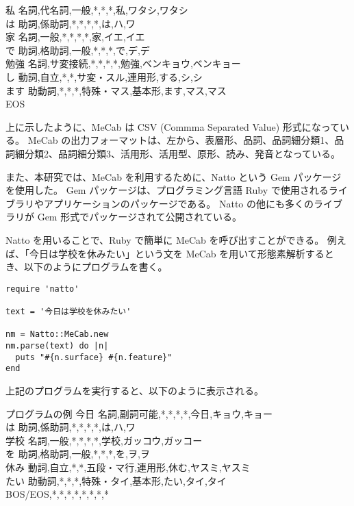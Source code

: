 \documentclass[11pt,a4j]{jsarticle}
\begin{document}
\begin{itembox}[l]
私  名詞,代名詞,一般,*,*,*,私,ワタシ,ワタシ\\
は  助詞,係助詞,*,*,*,*,は,ハ,ワ\\
家  名詞,一般,*,*,*,*,家,イエ,イエ\\
で  助詞,格助詞,一般,*,*,*,で,デ,デ\\
勉強  名詞,サ変接続,*,*,*,*,勉強,ベンキョウ,ベンキョー\\
し  動詞,自立,*,*,サ変・スル,連用形,する,シ,シ\\
ます  助動詞,*,*,*,特殊・マス,基本形,ます,マス,マス\\
EOS
\end{itembox}

上に示したように、MeCab は CSV (Commma Separated Value) 形式になっている。
MeCab の出力フォーマットは、左から、表層形、品詞、品詞細分類1、品詞細分類2、品詞細分類3、活用形、活用型、原形、読み、発音となっている。

また、本研究では、MeCab を利用するために、Natto という Gem パッケージを使用した。
Gem パッケージは、プログラミング言語 Ruby で使用されるライブラリやアプリケーションのパッケージである。
Natto の他にも多くのライブラリが Gem 形式でパッケージされて公開されている。

Natto を用いることで、Ruby で簡単に MeCab を呼び出すことができる。
例えば、「今日は学校を休みたい」という文を MeCab を用いて形態素解析するとき、以下のようにプログラムを書く。

\begin{verbatim}
require 'natto'

text = '今日は学校を休みたい'

nm = Natto::MeCab.new
nm.parse(text) do |n|
  puts "#{n.surface} #{n.feature}"
end
\end{verbatim}

上記のプログラムを実行すると、以下のように表示される。

\begin{itembox}[l]{プログラムの例}
  今日  名詞,副詞可能,*,*,*,*,今日,キョウ,キョー \\
  は  助詞,係助詞,*,*,*,*,は,ハ,ワ\\ 
  学校  名詞,一般,*,*,*,*,学校,ガッコウ,ガッコー\\
  を  助詞,格助詞,一般,*,*,*,を,ヲ,ヲ\\
  休み  動詞,自立,*,*,五段・マ行,連用形,休む,ヤスミ,ヤスミ\\
  たい  助動詞,*,*,*,特殊・タイ,基本形,たい,タイ,タイ\\
 BOS/EOS,*,*,*,*,*,*,*,*\\
\end{itembox}
\end{document}
